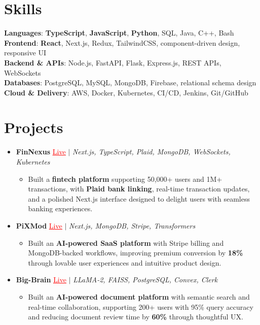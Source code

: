 \documentclass[letterpaper,10pt]{article}
\newcommand{\resumeItem}[1]{\item\small{{#1 \vspace{-2pt}}}}
\newcommand{\resumeProjectHeading}[1]{\item \small #1 \vspace{-2pt}}
\newcommand{\resumeSubHeadingListStart}{\begin{itemize}[leftmargin=0.0in, label={}]}
\newcommand{\resumeSubHeadingListEnd}{\end{itemize}}
\newcommand{\resumeProjItemListStart}{\begin{itemize}[leftmargin=0.15in,label=\textbullet,itemsep=0pt,topsep=0pt,parsep=0pt,partopsep=0pt]}
\newcommand{\resumeProjItemListEnd}{\end{itemize}\vspace{-4pt}}
\begin{document}
\section{Skills}
\begin{itemize}[leftmargin=0.15in, label={}]
\small{\item{
\textbf{Languages}: \textbf{TypeScript}, \textbf{JavaScript}, \textbf{Python}, SQL, Java, C++, Bash \\
\textbf{Frontend}: \textbf{React}, Next.js, Redux, TailwindCSS, component-driven design, responsive UI \\
\textbf{Backend \& APIs}: Node.js, FastAPI, Flask, Express.js, REST APIs, WebSockets \\
\textbf{Databases}: PostgreSQL, MySQL, MongoDB, Firebase, relational schema design \\
\textbf{Cloud \& Delivery}: AWS, Docker, Kubernetes, CI/CD, Jenkins, Git/GitHub
}}
\end{itemize}
\vspace{-16pt}
\section{Projects}
\resumeSubHeadingListStart
\vspace{-2pt}
\resumeProjectHeading{\textbf{FinNexus} {\href{https://fin-nexus.vercel.app/}{\textcolor{red}{\underline{Live}}}} $|$ \emph{Next.js, TypeScript, Plaid, MongoDB, WebSockets, Kubernetes}}
\resumeProjItemListStart
\resumeItem{Built a \textbf{fintech platform} supporting 50,000+ users and 1M+ transactions, with \textbf{Plaid bank linking}, real-time transaction updates, and a polished Next.js interface designed to delight users with seamless banking experiences.}
\resumeProjItemListEnd
\vspace{3pt}
\resumeProjectHeading{\textbf{PiXMod} {\href{https://pixmod.vercel.app/}{\textcolor{red}{\underline{Live}}}} $|$ \emph{Next.js, MongoDB, Stripe, Transformers}}
\resumeProjItemListStart
\resumeItem{Built an \textbf{AI-powered SaaS platform} with Stripe billing and MongoDB-backed workflows, improving premium conversion by \textbf{18\%} through lovable user experiences and intuitive product design.}
\resumeProjItemListEnd
\vspace{3pt}
\resumeProjectHeading{\textbf{Big-Brain} {\href{https://big-brain-pied.vercel.app/}{\textcolor{red}{\underline{Live}}}} $|$ \emph{LLaMA-2, FAISS, PostgreSQL, Convex, Clerk}}
\resumeProjItemListStart
\resumeItem{Built an \textbf{AI-powered document platform} with semantic search and real-time collaboration, supporting 200+ users with 95\% query accuracy and reducing document review time by \textbf{60\%} through thoughtful UX.}
\resumeProjItemListEnd
\resumeSubHeadingListEnd
\end{document}
